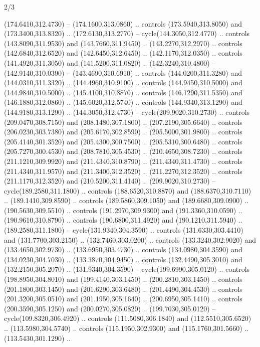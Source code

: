 \begin{flagdescription}{2/3}
\begin{scope}[xshift=0.5\flaglength,yshift=0.5\flagwidth,scale=\stretchfactor]
\begin{scope}[scale=0.001645\flagwidth,yshift=65mm,xshift=-63mm]
\begin{scope}[y=0.80pt, x=0.80pt, yscale=-1,]
\begin{scope}[cm={{1.33333,0.0,0.0,1.33333,(0.0,1e-05)}}]
  (174.6410,312.4730) -- (174.1600,313.0860) .. controls (173.5940,313.8050) and
  (173.3400,313.8320) .. (172.6130,313.2770) -- cycle(144.3050,312.4770) ..
  controls (143.8090,311.9530) and (143.7660,311.9450) .. (143.2270,312.2970) ..
  controls (142.6840,312.6520) and (142.6450,312.6450) .. (142.1170,312.0350) ..
  controls (141.4920,311.3050) and (141.5200,311.0820) .. (142.3240,310.4800) --
  (142.9140,310.0390) -- (143.4690,310.6910) .. controls (144.0200,311.3280) and
  (144.0310,311.3320) .. (144.4960,310.9100) .. controls (144.9450,310.5000) and
  (144.9840,310.5000) .. (145.4100,310.8870) .. controls (146.1290,311.5350) and
  (146.1880,312.0860) .. (145.6020,312.5740) .. controls (144.9340,313.1290) and
  (144.9180,313.1290) .. (144.3050,312.4730) -- cycle(209.9020,310.2730) ..
  controls (209.0470,308.7150) and (208.1480,307.1800) .. (207.2190,305.6640) ..
  controls (206.0230,303.7380) and (205.6170,302.8590) .. (205.5000,301.9800) ..
  controls (205.4140,301.3520) and (205.4300,300.7500) .. (205.5310,300.6480) ..
  controls (205.7270,300.4530) and (208.7810,305.4530) .. (210.4650,308.7230) ..
  controls (211.1210,309.9920) and (211.4340,310.8790) .. (211.4340,311.4730) ..
  controls (211.4340,311.9570) and (211.3400,312.3520) .. (211.2270,312.3520) ..
  controls (211.1170,312.3520) and (210.5200,311.4140) .. (209.9020,310.2730) --
  cycle(189.2580,311.1800) .. controls (188.6520,310.8870) and
  (188.6370,310.7110) .. (189.1410,309.8590) .. controls (189.5860,309.1050) and
  (189.6680,309.0900) .. (190.5630,309.5510) .. controls (191.2970,309.9300) and
  (191.3360,310.0590) .. (190.9610,310.8790) .. controls (190.6800,311.4920) and
  (190.1210,311.5940) .. (189.2580,311.1800) -- cycle(131.9340,304.3590) ..
  controls (131.6330,303.4410) and (131.7700,303.2150) .. (132.7460,303.0200) ..
  controls (133.3240,302.9020) and (133.4650,302.9730) .. (133.6950,303.4730) ..
  controls (134.0980,304.3590) and (134.0230,304.7030) .. (133.3870,304.9450) ..
  controls (132.4490,305.3010) and (132.2150,305.2070) .. (131.9340,304.3590) --
  cycle(199.6990,305.0120) .. controls (198.8950,304.8010) and
  (199.4140,303.1450) .. (200.2810,303.1450) .. controls (201.1800,303.1450) and
  (201.6290,303.6480) .. (201.4490,304.4530) .. controls (201.3200,305.0510) and
  (201.1950,305.1640) .. (200.6950,305.1410) .. controls (200.3590,305.1250) and
  (200.0270,305.0820) .. (199.7030,305.0120) -- cycle(109.8320,306.4920) ..
  controls (111.5080,306.1840) and (112.5510,305.6520) .. (113.5980,304.5740) ..
  controls (115.1950,302.9300) and (115.1760,301.5660) .. (113.5430,301.1290) ..

\end{scope}
\end{scope}
\end{scope}
\end{scope}
\end{flagdescription}
